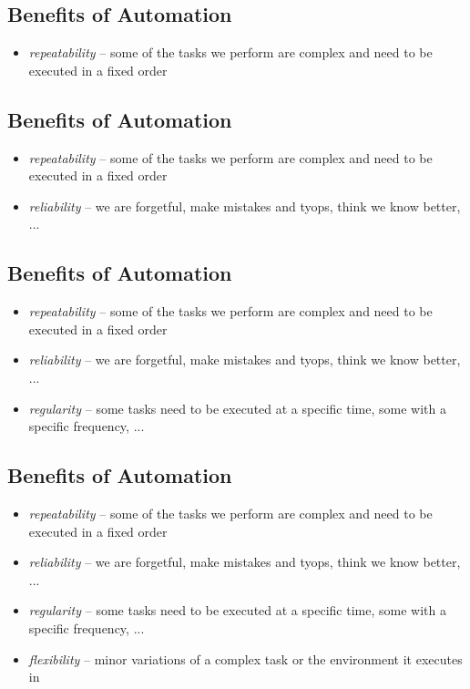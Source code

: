 \documentclass[xga]{xdvislides}
\begin{document}
\subsection{Benefits of Automation}
\begin{itemize}
	\item {\em repeatability} -- some of the tasks we
		perform are complex and need to be
		executed in a fixed order
\end{itemize}

\subsection{Benefits of Automation}
\begin{itemize}
	\item {\em repeatability} -- some of the tasks we
		perform are complex and need to be
		executed in a fixed order
	\item {\em reliability} -- we are forgetful, make
		mistakes and tyops, think we know
		better, ...
\end{itemize}

\subsection{Benefits of Automation}
\begin{itemize}
	\item {\em repeatability} -- some of the tasks we
		perform are complex and need to be
		executed in a fixed order
	\item {\em reliability} -- we are forgetful, make
		mistakes and tyops, think we know
		better, ...
	\item {\em regularity} -- some tasks need to
		be executed at a specific time, some with
		a specific frequency, ...
\end{itemize}

\subsection{Benefits of Automation}
\begin{itemize}
	\item {\em repeatability} -- some of the tasks we
		perform are complex and need to be
		executed in a fixed order
	\item {\em reliability} -- we are forgetful, make
		mistakes and tyops, think we know
		better, ...
	\item {\em regularity} -- some tasks need to
		be executed at a specific time, some with
		a specific frequency, ...
	\item {\em flexibility} -- minor variations of
		a complex task or the environment it
		executes in
\end{itemize}
\end{document}
